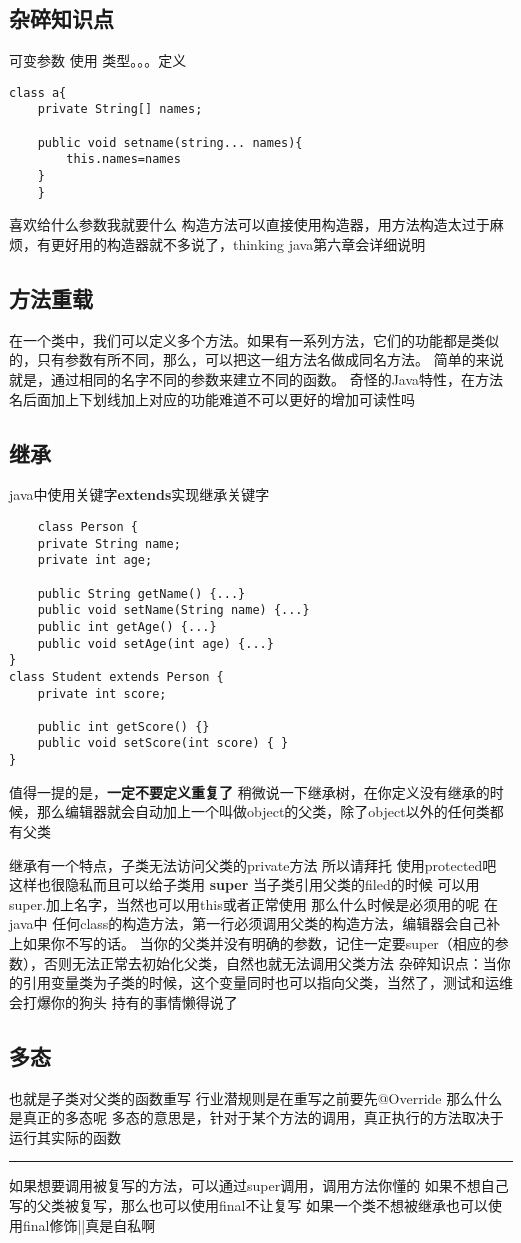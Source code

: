 \documentclass[a4paper,12pt]{ctexbook}
\begin{document}
\subsection{杂碎知识点}
可变参数 使用 类型。。。定义
\begin{lstlisting}
class a{
    private String[] names;

    public void setname(string... names){
        this.names=names
    }
    }
\end{lstlisting}
喜欢给什么参数我就要什么
构造方法可以直接使用构造器，用方法构造太过于麻烦，有更好用的构造器就不多说了，thinking java第六章会详细说明
\subsection{方法重载}
在一个类中，我们可以定义多个方法。如果有一系列方法，它们的功能都是类似的，只有参数有所不同，那么，可以把这一组方法名做成同名方法。
简单的来说就是，通过相同的名字不同的参数来建立不同的函数。
奇怪的Java特性，在方法名后面加上下划线加上对应的功能难道不可以更好的增加可读性吗
\subsection{继承}
java中使用关键字\textbf{extends}实现继承关键字
\begin{lstlisting}
    class Person {
    private String name;
    private int age;

    public String getName() {...}
    public void setName(String name) {...}
    public int getAge() {...}
    public void setAge(int age) {...}
}
class Student extends Person {
    private int score;

    public int getScore() {}
    public void setScore(int score) { }
}
\end{lstlisting}
值得一提的是，\textbf{一定不要定义重复了}
稍微说一下继承树，在你定义没有继承的时候，那么编辑器就会自动加上一个叫做object的父类，除了object以外的任何类都有父类

继承有一个特点，子类无法访问父类的private方法
所以请拜托 使用protected吧 这样也很隐私而且可以给子类用
\textbf{super} 当子类引用父类的filed的时候 可以用super.加上名字，当然也可以用this或者正常使用
那么什么时候是必须用的呢
在java中 任何class的构造方法，第一行必须调用父类的构造方法，编辑器会自己补上如果你不写的话。
当你的父类并没有明确的参数，记住一定要super（相应的参数），否则无法正常去初始化父类，自然也就无法调用父类方法
杂碎知识点：当你的引用变量类为子类的时候，这个变量同时也可以指向父类，当然了，测试和运维会打爆你的狗头
持有的事情懒得说了
\subsection{多态}
也就是子类对父类的函数重写
行业潜规则是在重写之前要先@Override
那么什么是真正的多态呢
多态的意思是，针对于某个方法的调用，真正执行的方法取决于运行其实际的函数
\hrule
如果想要调用被复写的方法，可以通过super调用，调用方法你懂的
如果不想自己写的父类被复写，那么也可以使用final不让复写
如果一个类不想被继承也可以使用final修饰||真是自私啊
\end{document}
